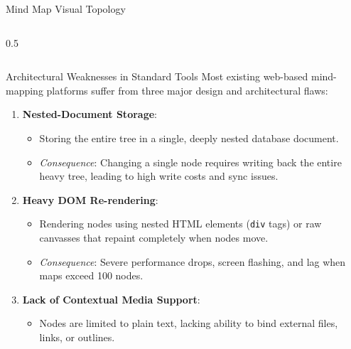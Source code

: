 \documentclass[aspectratio=169, 10pt]{beamer}
\begin{document}
\begin{frame}{Mind Map Visual Topology}
\begin{columns}
\begin{column}{0.5\textwidth}
\begin{center}
      \end{center}
    \end{column}
  \end{columns}
\end{frame}

\begin{frame}{Architectural Weaknesses in Standard Tools}
  Most existing web-based mind-mapping platforms suffer from three major design and architectural flaws:
  \vspace{0.5em}
  \begin{enumerate}
    \item \textbf{Nested-Document Storage}:
      \begin{itemize}
        \item Storing the entire tree in a single, deeply nested database document.
        \item \textit{Consequence}: Changing a single node requires writing back the entire heavy tree, leading to high write costs and sync issues.
      \end{itemize}
    \item \textbf{Heavy DOM Re-rendering}:
      \begin{itemize}
        \item Rendering nodes using nested HTML elements (\texttt{div} tags) or raw canvasses that repaint completely when nodes move.
        \item \textit{Consequence}: Severe performance drops, screen flashing, and lag when maps exceed 100 nodes.
      \end{itemize}
    \item \textbf{Lack of Contextual Media Support}:
      \begin{itemize}
        \item Nodes are limited to plain text, lacking ability to bind external files, links, or outlines.
      \end{itemize}
  \end{enumerate}
\end{frame}
\end{document}
